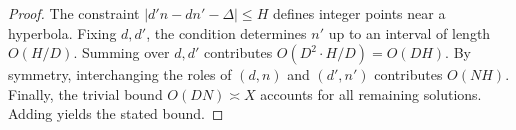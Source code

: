 \begin{proof}
The constraint $|d'n - dn' - \Delta|\le H$ defines integer points near a hyperbola.  
Fixing $d,d'$, the condition determines $n'$ up to an interval of length $O(H/D)$.  
Summing over $d,d'$ contributes $O(D^2\cdot H/D)=O(DH)$.  
By symmetry, interchanging the roles of $(d,n)$ and $(d',n')$ contributes $O(NH)$.  
Finally, the trivial bound $O(DN)\asymp X$ accounts for all remaining solutions.  
Adding yields the stated bound.
\end{proof}
